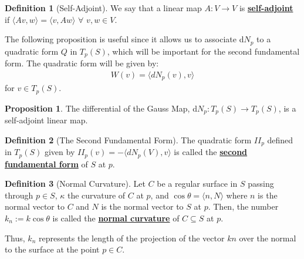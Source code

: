 \documentclass[11pt]{scrartcl}
\theoremstyle{definition}
\newtheorem{definition}{Definition}
\newtheorem{prop}{Proposition}
\theoremstyle{remark}
\newcommand{\dfn}[1]{\textbf{\underline{#1}}}
\begin{document}
{\begin{definition}[Self-Adjoint]
	We say that a linear map $A: V \rightarrow V$ is \dfn{self-adjoint} if $\langle Av, w \rangle = \langle v, Aw \rangle$ $\forall$ $v, w \in V$. 
\end{definition}

The following proposition is useful since it allows us to associate d$N_p$ to a quadratic form $Q$ in $T_p(S)$, which will be important for the second fundamental form. The quadratic form will be given by: 
\begin{align*}
	W(v) = \langle dN_p(v), v \rangle 
\end{align*}
for $v \in T_p(S)$. 


\begin{prop}
	The differential of the Gauss Map, d$N_p: T_p(S) \rightarrow T_p(S)$, is a self-adjoint linear map. 
\end{prop}

\begin{definition}[The Second Fundamental Form]
	The quadratic form $II_p$ defined in $T_p(S)$ given by $II_p(v) = - \langle dN_p(V), v \rangle$ is called the \dfn{second fundamental form} of $S$ at $p$. 
\end{definition}

\begin{definition}[Normal Curvature]
	Let $C$ be a regular surface in $S$ passing through $p \in S$, $\kappa$ the curvature of $C$ at $p$, and $\cos \theta = \langle n, N \rangle$ where $n$ is the normal vector to $C$ and $N$ is the normal vector to $S$ at $p$. Then, the number $k_n := k \cos \theta$ is called the \dfn{normal curvature} of $C \subseteq S$ at $p$. 
\end{definition}
Thus, $k_n$ represents the length of the projection of the vector $kn$ over the normal to the surface at the point $p \in C$. 

}
\end{document}

